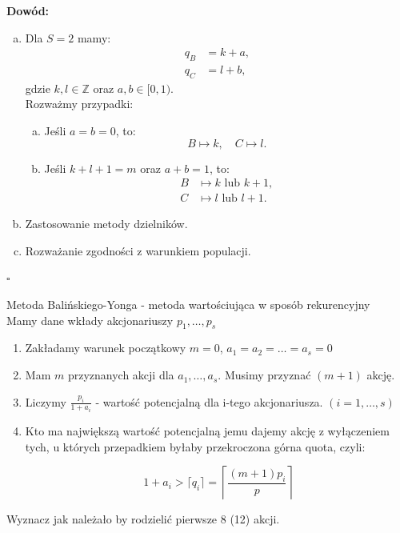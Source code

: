 \documentclass[12pt,a4paper]{article}
\theoremstyle{break}
\begin{document}
	\noindent \textbf{Dowód:}
	\begin{enumerate}[a)]
		\item Dla $S = 2$ mamy:
		\begin{align*}
			q_B &= k + a, \\
			q_C &= l + b,
		\end{align*}
		gdzie $k, l \in \mathbb{Z}$ oraz $a, b \in [0, 1)$. \\
		Rozważmy przypadki:
		\begin{enumerate}[a)]
			\item Jeśli $a = b = 0$, to:
			\[
			B \mapsto k, \quad C \mapsto l.
			\]
			\item Jeśli $k + l + 1 = m$ oraz $a + b = 1$, to:
			\begin{align*}
				B &\mapsto k \text{ lub } k+1, \\
				C &\mapsto l \text{ lub } l+1.
			\end{align*}
		\end{enumerate}
		
		\item Zastosowanie metody dzielników.
		
		\item Rozważanie zgodności z warunkiem populacji.
	\end{enumerate}
	\begin{flushright}
		$\square$
	\end{flushright}
	
	\begin{zad}
		Metoda Balińskiego-Yonga - metoda wartościująca w sposób rekurencyjny\\
		
		Mamy dane wkłady akcjonariuszy $p_1,\dots,p_s$
		
		\begin{enumerate}[1.]
			\item Zakładamy warunek początkowy $m=0$, $a_1=a_2=\dots=a_s=0$
			\item Mam $m$ przyznanych akcji dla $a_1,\dots,a_s$. Musimy przyznać $(m+1)$ akcję.
			\item Liczymy $\frac{p_i}{1+a_i}$ - wartość potencjalną dla i-tego akcjonariusza. $(i=1,\dots,s)$
			\item Kto ma największą wartość potencjalną jemu dajemy akcję z wyłączeniem tych, u których przepadkiem byłaby przekroczona górna quota, czyli:
			
			$$~ 1+a_i > \lceil q_i \rceil = \left\lceil \frac{(m+1)p_i}{p}\right\rceil$$ 
		\end{enumerate}
		
		Wyznacz jak należało by rodzielić pierwsze 8 (12) akcji.
	\end{zad}
	
\end{document}
